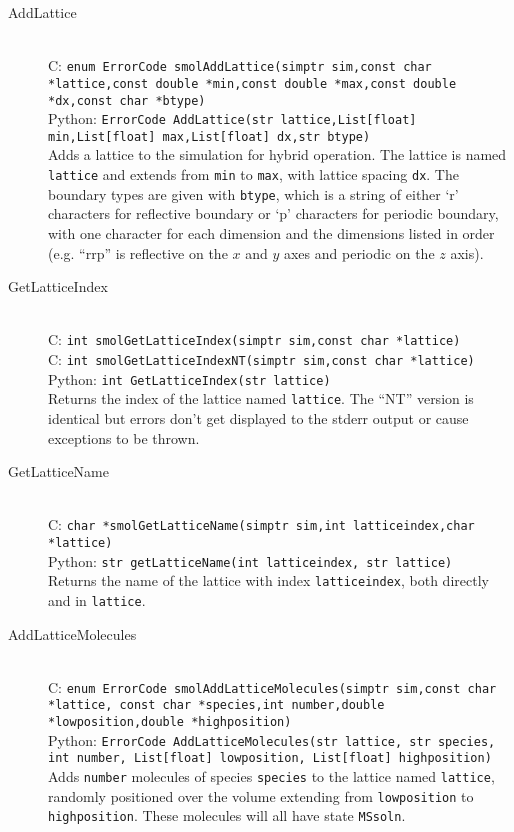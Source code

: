 \documentclass {book}
\newcommand {\ttt} {\texttt}
\begin{document}
\begin{description}

\item[AddLattice]
\hfill \\
C: \ttt{enum ErrorCode smolAddLattice(simptr sim,const char *lattice,const double *min,const double *max,const double *dx,const char *btype)}\\
Python: \ttt{ErrorCode AddLattice(str lattice,List[float] min,List[float] max,List[float] dx,str btype)}\\
Adds a lattice to the simulation for hybrid operation. The lattice is named \ttt{lattice} and extends from \ttt{min} to \ttt{max}, with lattice spacing \ttt{dx}. The boundary types are given with \ttt{btype}, which is a string of either `r' characters for reflective boundary or `p' characters for periodic boundary, with one character for each dimension and the dimensions listed in order (e.g. ``rrp'' is reflective on the $x$ and $y$ axes and periodic on the $z$ axis).

\item[GetLatticeIndex]
\hfill \\
C: \ttt{int smolGetLatticeIndex(simptr sim,const char *lattice)}\\
C: \ttt{int smolGetLatticeIndexNT(simptr sim,const char *lattice)}\\
Python: \ttt{int GetLatticeIndex(str lattice)}\\
Returns the index of the lattice named \ttt{lattice}. The ``NT'' version is identical but errors don't get displayed to the stderr output or cause exceptions to be thrown.

\item[GetLatticeName]
\hfill \\
C: \ttt{char *smolGetLatticeName(simptr sim,int latticeindex,char *lattice)}\\
Python: \ttt{str getLatticeName(int latticeindex, str lattice)}\\
Returns the name of the lattice with index \ttt{latticeindex}, both directly and in \ttt{lattice}.

\item[AddLatticeMolecules]
\hfill \\
C: \ttt{enum ErrorCode smolAddLatticeMolecules(simptr sim,const char *lattice, const char *species,int number,double *lowposition,double *highposition)}\\
Python: \ttt{ErrorCode AddLatticeMolecules(str lattice, str species, int number, List[float] lowposition, List[float] highposition)}\\
Adds \ttt{number} molecules of species \ttt{species} to the lattice named \ttt{lattice}, randomly positioned over the volume extending from \ttt{lowposition} to \ttt{highposition}. These molecules will all have state \ttt{MSsoln}.


\end{description}
\end{document}

